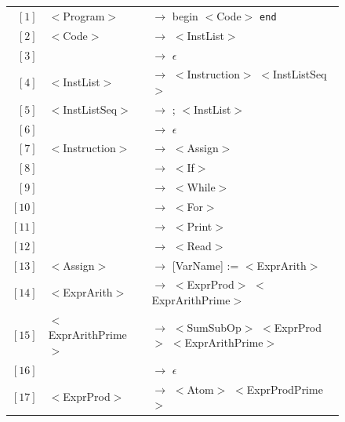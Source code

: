 \documentclass[letterpaper]{article}
\begin{document}
\begin{figure}
    \begin{center}
            \begin{tabular}{r l l}
                $[1]$ & $<$Program$>$ & $\rightarrow$ begin $<$Code$>$
                \texttt{end} \\

                $[2]$ & $<$Code$>$ & $\rightarrow$ $<$InstList$>$ \\
                $[3]$ & & $\rightarrow$ $\epsilon$ \\

                $[4]$ & $<$InstList$>$ & $\rightarrow$ $<$Instruction$>$
                $<$InstListSeq$>$ \\

                $[5]$ & $<$InstListSeq$>$ & $\rightarrow$ ; $<$InstList$>$ \\
                $[6]$ & & $\rightarrow$ $\epsilon$ \\

                $[7]$ & $<$Instruction$>$ & $\rightarrow$ $<$Assign$>$ \\
                $[8]$ &                   & $\rightarrow$ $<$If$>$ \\
                $[9]$ &                   & $\rightarrow$ $<$While$>$ \\
                $[10]$ &                   & $\rightarrow$ $<$For$>$ \\
                $[11]$ &                   & $\rightarrow$ $<$Print$>$ \\
                $[12]$ &                   & $\rightarrow$ $<$Read$>$ \\

                $[13]$ & $<$Assign$>$ & $\rightarrow$
                 [VarName] := $<$ExprArith$>$  \\

                $[14]$ & $<$ExprArith$>$ & $\rightarrow$
                $<$ExprProd$>$ $<$ExprArithPrime$>$ \\

                $[15]$ & $<$ExprArithPrime$>$ & $\rightarrow$
                $<$SumSubOp$>$ $<$ExprProd$>$ $<$ExprArithPrime$>$ \\
                $[16]$ & & $\rightarrow$ $\epsilon$ \\

                $[17]$ & $<$ExprProd$>$ & $\rightarrow$
                $<$Atom$>$ $<$ExprProdPrime$>$ \\


\end{tabular}
\end{center}
\end{figure}
\end{document}
